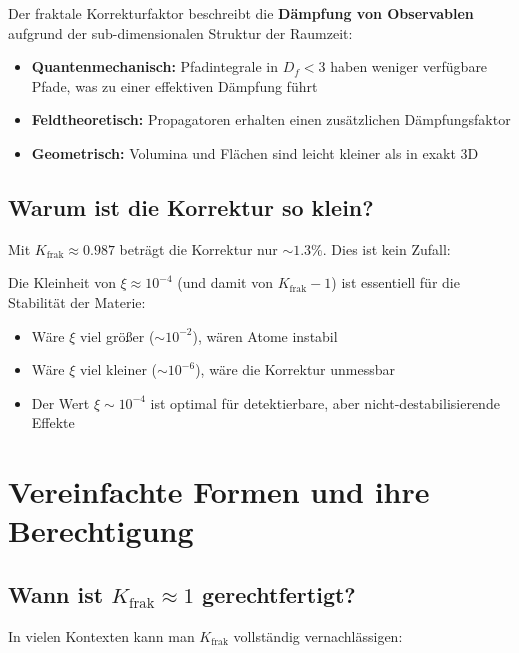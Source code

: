 	Der fraktale Korrekturfaktor beschreibt die \textbf{Dämpfung von Observablen} aufgrund der sub-dimensionalen Struktur der Raumzeit:
	
	\begin{itemize}
		\item \textbf{Quantenmechanisch:} Pfadintegrale in $D_f < 3$ haben weniger verfügbare Pfade, was zu einer effektiven Dämpfung führt
		\item \textbf{Feldtheoretisch:} Propagatoren erhalten einen zusätzlichen Dämpfungsfaktor
		\item \textbf{Geometrisch:} Volumina und Flächen sind leicht kleiner als in exakt 3D
	\end{itemize}
	
	\subsection{Warum ist die Korrektur so klein?}
	
	Mit $K_{\text{frak}} \approx 0.987$ beträgt die Korrektur nur $\sim 1.3\%$. Dies ist kein Zufall:
	
	\begin{tcolorbox}[colback=blue!5!white,colframe=blue!75!black,title={Feinabstimmung der Natur}]
		Die Kleinheit von $\xi \approx 10^{-4}$ (und damit von $K_{\text{frak}} - 1$) ist essentiell für die Stabilität der Materie:
		
		\begin{itemize}
			\item Wäre $\xi$ viel größer ($\sim 10^{-2}$), wären Atome instabil
			\item Wäre $\xi$ viel kleiner ($\sim 10^{-6}$), wäre die Korrektur unmessbar
			\item Der Wert $\xi \sim 10^{-4}$ ist optimal für detektierbare, aber nicht-destabilisierende Effekte
		\end{itemize}
	\end{tcolorbox}
	
	\section{Vereinfachte Formen und ihre Berechtigung}
	
	\subsection{Wann ist $K_{\text{frak}} \approx 1$ gerechtfertigt?}
	
	In vielen Kontexten kann man $K_{\text{frak}}$ vollständig vernachlässigen:
	
